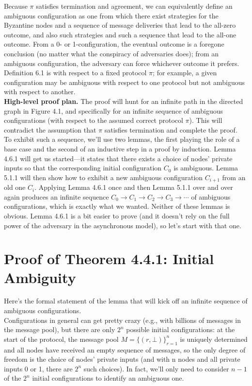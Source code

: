 Because $\pi$ satisfies termination and agreement, we can equivalently define an ambiguous
configuration as one from which there exist strategies for the Byzantine nodes and a sequence
of message deliveries that lead to the all-zero outcome, and also such strategies and such
a sequence that lead to the all-one outcome. From a 0- or 1-configuration, the eventual
outcome is a foregone conclusion (no matter what the conspiracy of adversaries does); from an
ambiguous configuration, the adversary can force whichever outcome it prefers. Definition 6.1
is with respect to a fixed protocol $\pi$; for example, a given configuration may be ambiguous
with respect to one protocol but not ambiguous with respect to another.\\

\noindent
\textbf{High-level proof plan.} The proof will hunt for an infinite path in the directed graph in
Figure 4.1, and specifically for an infinite sequence of ambiguous configurations (with respect
to the assumed correct protocol $\pi$). This will contradict the assumption that $\pi$ satisfies
termination and complete the proof.\\
To exhibit such a sequence, we’ll use two lemmas, the first playing the role of a base
case and the second of an inductive step in a proof by induction. Lemma 4.6.1 will get us
started—it states that there exists a choice of nodes’ private inputs so that the corresponding
initial configuration $C_0$ is ambiguous. Lemma 5.1.1 will then show how to exhibit a new
ambiguous configuration $C_{i+1}$ from an old one $C_i$. Applying Lemma 4.6.1 once and then
Lemma 5.1.1 over and over again produces an infinite sequence $C_0 \to C_1 \to C_2 \to C_3 \to \cdots$
of ambiguous configurations, which is exactly what we wanted. Neither of these lemmas is
obvious. Lemma 4.6.1 is a bit easier to prove (and it doesn't rely on the full power of the
adversary in the asynchronous model), so let’s start with that one.

\section{Proof of Theorem 4.4.1: Initial Ambiguity}
Here’s the formal statement of the lemma that will kick off an infinite sequence of ambiguous
configurations.\\
Configurations in general can get pretty crazy (e.g., with billions of messages in the
message pool), but there are only $2^n$ possible initial configurations: at the start of the
protocol, the message pool $M = \{(r, \bot)\}^n_{r=1}$ is uniquely determined and all nodes have
received an empty sequence of messages, so the only degree of freedom is the choice of
nodes’ private inputs (and with n nodes and all private inputs 0 or 1, there are $2^n$
such choices). In fact, we’ll only need to consider $n − 1$ of the $2^n$
initial configurations to identify
an ambiguous one.\\

